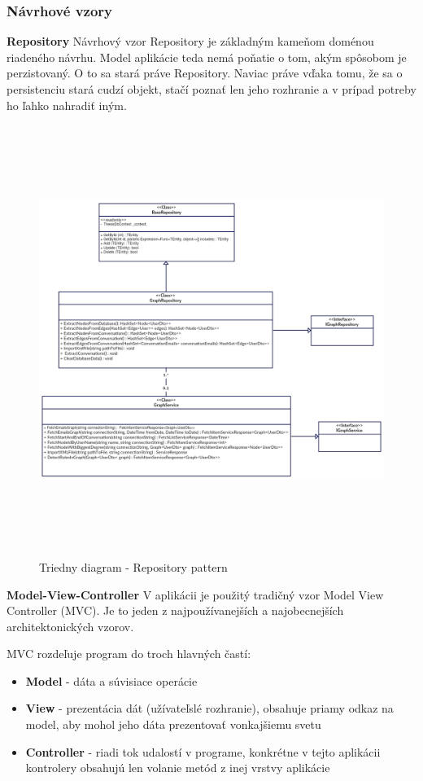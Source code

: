 \documentclass[slovak,master,public,dept460,male,cpdeclaration,oneside]{diploma}
\begin{document}
\subsubsection{Návrhové vzory}

\indent
\indent \textbf{Repository}
Návrhový vzor Repository je základným kameňom doménou riadeného návrhu. Model aplikácie teda nemá poňatie o tom, akým spôsobom je perzistovaný. O to sa stará práve Repository. Naviac práve vďaka tomu, že sa o persistenciu stará cudzí objekt, stačí poznať len jeho rozhranie a v prípad potreby ho ľahko nahradiť iným. \cite{11}

\begin{figure}[H]
\centering
\includegraphics[width=13cm, height=14cm]{figures/diagram_class}
\caption{Triedny diagram - Repository pattern}
\end{figure}



\textbf{Model-View-Controller}
V aplikácii je použitý tradičný vzor Model View Controller (MVC). Je to jeden z najpoužívanejších a najobecnejších architektonických vzorov. 

MVC rozdeľuje program do troch hlavných častí:
\begin{itemize}
\item \textbf{Model} - dáta a súvisiace operácie 
\item \textbf{View} - prezentácia dát (užívateľslé rozhranie), obsahuje priamy odkaz na model, aby mohol jeho dáta prezentovať vonkajšiemu svetu
\item \textbf{Controller} - riadi tok udalostí v programe, konkrétne v tejto aplikácii kontrolery obsahujú len volanie metód z inej vrstvy aplikácie
\end{itemize}
\end{document}

